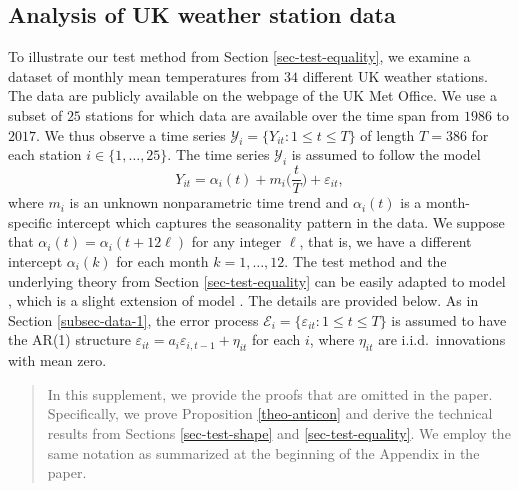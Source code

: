 \documentclass[a4paper,12pt]{article}
\makeatletter
\renewcommand{\eqref}[1]{\tagform@{\ref{#1}}}
\makeatother
\begin{document}
\subsection{Analysis of UK weather station data}\label{subsec-data-2} 



To illustrate our test method from Section \ref{sec-test-equality}, we examine a dataset of monthly mean temperatures from $34$ different UK weather stations. The data are publicly available on the webpage of the UK Met Office. We use a subset of $25$ stations for which data are available over the time span from $1986$ to $2017$. We thus observe a time series $\mathcal{Y}_i = \{Y_{it}: 1 \le t \le T \}$ of length $T = 386$ for each station $i \in \{1,\ldots,25\}$. The time series $\mathcal{Y}_i$ is assumed to follow the model 
\begin{equation}\label{model2-app}
Y_{it} = \alpha_i(t) + m_i\Big(\frac{t}{T}\Big) + \varepsilon_{it}, 
\end{equation}
where $m_i$ is an unknown nonparametric time trend and $\alpha_i(t)$ is a month-specific intercept which captures the seasonality pattern in the data. We suppose that $\alpha_i(t) = \alpha_i(t + 12 \ell)$ for any integer $\ell$, that is, we have a different intercept $\alpha_i(k)$ for each month $k = 1,\ldots,12$. The test method and the underlying theory from Section \ref{sec-test-equality} can be easily adapted to model \eqref{model2-app}, which is a slight extension of model \eqref{model2}. The details are provided below. As in Section \ref{subsec-data-1}, the error process $\mathcal{E}_i = \{ \varepsilon_{it}: 1 \le t \le T \}$ is assumed to have the AR(1) structure $\varepsilon_{it} = a_i \varepsilon_{i,t-1} + \eta_{it}$ for each $i$, where $\eta_{it}$ are i.i.d.\ innovations with mean zero.  

\renewcommand{\abstractname}{}
\begin{abstract}
\noindent In this supplement, we provide the proofs that are omitted in the paper. Speci\-fically, we prove Proposition \ref{theo-anticon} and derive the technical results from Sections \ref{sec-test-shape} and \ref{sec-test-equality}. We employ the same notation as summarized at the beginning of the Appendix in the paper. 
\end{abstract}
\end{document}
